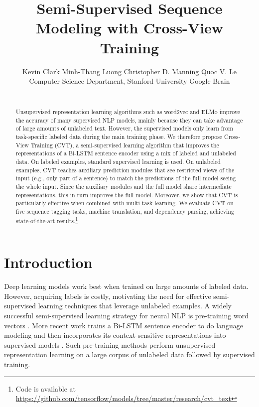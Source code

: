 \documentclass[11pt,a4paper]{article}
\title{Semi-Supervised Sequence Modeling with Cross-View Training}
\author{Kevin Clark \hspace{3mm} Minh-Thang Luong \hspace{3mm} Christopher D. Manning \hspace{3mm} Quoc V. Le\\
   Computer Science Department, Stanford University \hspace{6mm} Google Brain \\
   \resizebox{0.99\textwidth}{!}{\tt kevclark@cs.stanford.edu, thangluong@google.com, manning@cs.stanford.edu, qvl@google.com} \\
 }
\date{}
\begin{document}
\maketitle



\begin{abstract}
Unsupervised representation learning algorithms such as word2vec and ELMo improve the accuracy of many supervised NLP models, mainly because they can take advantage of large amounts of unlabeled text.
However, the supervised models only learn from task-specific labeled data during the main training phase.
We therefore propose Cross-View Training (CVT), a semi-supervised learning algorithm that improves the representations of a Bi-LSTM sentence encoder using a mix of labeled and unlabeled data.
On labeled examples, standard supervised learning is used.
On unlabeled examples, CVT teaches auxiliary prediction modules that see restricted views of the input (e.g., only part of a sentence) to match the predictions of the full model seeing the whole input.
Since the auxiliary modules and the full model share intermediate representations, this in turn improves the full model. 
Moreover, we show that CVT is particularly effective when combined with multi-task learning.
We evaluate CVT on five sequence tagging tasks, machine translation, and dependency parsing, achieving state-of-the-art results.\footnote{Code is available at \url{https://github.com/tensorflow/models/tree/master/research/cvt_text}}
\end{abstract}



\section{Introduction}

Deep learning models work best when trained on large amounts of labeled data.
However, acquiring labels is costly, motivating the need for effective semi-supervised learning techniques that leverage unlabeled examples.
A widely successful semi-supervised learning strategy for neural NLP is pre-training word vectors \citep{Mikolov2013DistributedRO}.
More recent work trains a Bi-LSTM sentence encoder to do language modeling and then incorporates its context-sensitive 
representations into supervised models \citep{dai2015semi,peters2018deep}. 
Such pre-training methods perform unsupervised representation learning on a large corpus of unlabeled data followed by supervised training.
\end{document}
